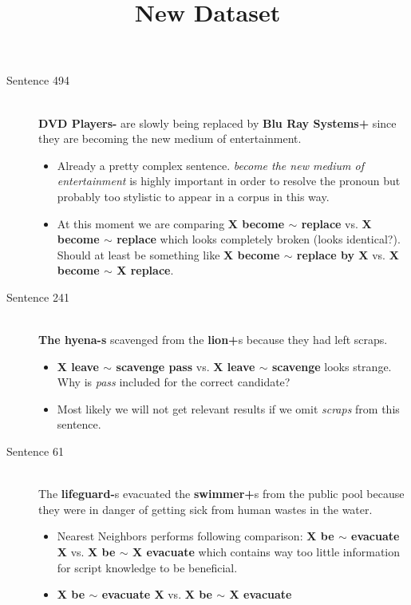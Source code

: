 \documentclass{scrartcl}
\begin{document}
\begin{description}
  \item[Sentence 494] \hfill \\
  {\bf DVD Players-} are slowly being replaced by {\bf Blu Ray Systems+} since they are becoming the new medium of entertainment.
  \begin{itemize}
  	\item Already a pretty complex sentence. {\it become the new medium of entertainment} is highly important in order to resolve the pronoun but probably too stylistic to appear in a corpus in this way.
  	\item At this moment we are comparing {\bf X become $\sim$ replace} vs. {\bf X become $\sim$ replace} which looks completely broken (looks identical?). Should at least be something like {\bf X become $\sim$ replace by X} vs. {\bf X become $\sim$ X replace}.
  \end{itemize}

  \item[Sentence 241] \hfill \\
  {\bf The hyena-s} scavenged from the {\bf lion+}s because they had left scraps.
  \begin{itemize}
  	\item {\bf X leave $\sim$ scavenge pass} vs. {\bf X leave $\sim$ scavenge} looks strange. Why is {\it pass} included for the correct candidate?
  	\item Most likely we will not get relevant results if we omit {\it scraps} from this sentence.
  \end{itemize}

\newpage
\begin{center}
	\title{{\large New Dataset}}
\end{center}

  \item[Sentence 61] \hfill \\
  The {\bf lifeguard-}s evacuated the {\bf swimmer+}s from the public pool because they were in danger of getting sick from human wastes in the water.
  \begin{itemize}
  	\item Nearest Neighbors performs following comparison: {\bf X be $\sim$ evacuate X} vs. {\bf X be $\sim$ X evacuate} which contains way too little information for script knowledge to be beneficial.
  	\item {\bf X be $\sim$ evacuate X} vs. {\bf X be $\sim$ X evacuate}
  \end{itemize}



\end{description}
\end{document}
